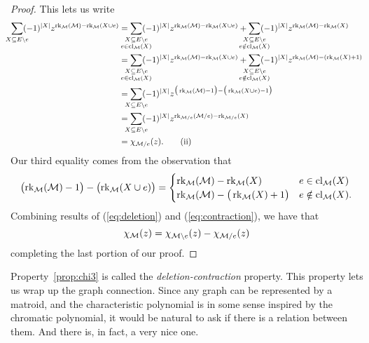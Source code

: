 \documentclass[12pt,oneside]{../../sfsuthesis}
\begin{document}
\begin{proof}
    This lets us write
    \begin{align*}
        \sum_{\mathclap{X \subseteq E \setminus e}} (-1)^{|X|} z^{\rk_\cM(\cM) - \rk_\cM(X \cup e)}
         & = \sum_{\mathclap{\substack{X \subseteq E \setminus e                                                                                \\ e \in \cl_\cM(X)}}} (-1)^{|X|} z^{\rk_\cM(\cM) - \rk_\cM(X \cup e)}
        + \sum_{\mathclap{\substack{X \subseteq E \setminus e                                                                                   \\ e \notin \cl_\cM(X)}}} (-1)^{|X|} z^{\rk_\cM(\cM) - \rk_\cM(X)} \\
         & = \sum_{\mathclap{\substack{X \subseteq E \setminus e                                                                                \\ e \in \cl_\cM(X)}}} (-1)^{|X|} z^{\rk_\cM(\cM) - \rk_\cM(X \cup e)}
        + \sum_{\mathclap{\substack{X \subseteq E \setminus e                                                                                   \\ e \notin \cl_\cM(X)}}} (-1)^{|X|} z^{\rk_\cM(\cM) - (\rk_\cM(X) + 1)} \\
         & = \sum_{\mathclap{\substack{X \subseteq E \setminus e}}} (-1)^{|X|} z^{\big(\rk_\cM(\cM) - 1\big) - \big(\rk_\cM(X \cup e) - 1\big)} \\
         & = \sum_{\mathclap{\substack{X \subseteq E \setminus e}}} (-1)^{|X|} z^{\rk_{\cM / e}(\cM / e) - \rk_{\cM / e}(X)}                    \\
         & = \chi_{\cM / e }(z). \tag{ii}\label{eq:contraction}
    \end{align*}
    Our third equality comes from the observation that
    \[
        \bigl( \operatorname{rk}_{\mathcal{M}}(\mathcal{M}) - 1 \bigr) - \bigl( \operatorname{rk}_{\mathcal{M}}(X \cup e )\bigr)
        = \begin{cases}
            \operatorname{rk}_{\mathcal{M}}( \mathcal{M} ) - \operatorname{rk}_{\mathcal{M}}(X)                 & e \in \operatorname{cl}_{\mathcal{M}}(X)     \\
            \operatorname{rk}_{\mathcal{M}}( \mathcal{M} ) - \big( \operatorname{rk}_{\mathcal{M}}(X) + 1 \big) & e \notin \operatorname{cl}_{\mathcal{M}}(X).
        \end{cases}
    \]
    Combining results of (\ref{eq:deletion}) and (\ref{eq:contraction}), we have that
    \[
        \chi_{\mathcal{M}}(z) = \chi_{\mathcal{M} \setminus e}(z) - \chi_{\mathcal{M} / e}(z)
    \]
    completing the last portion of our proof.

\end{proof}
Property~\ref{prop:chi3} is called the \emph{deletion-contraction} property.
This property lets us wrap up the graph connection.
Since any graph can be represented by a matroid, and the characteristic polynomial is in some sense inspired by the chromatic polynomial, it would be natural to ask if there is a relation between them.
And there is, in fact, a very nice one.
\end{document}

